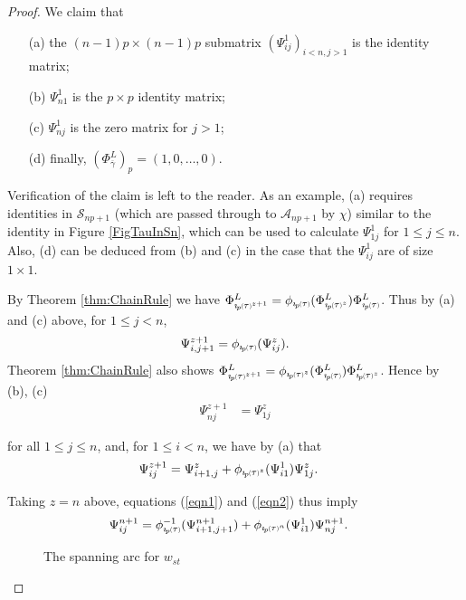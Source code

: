 \documentclass[11pt]{amsart}
\def\A{{\mathcal A}}
\newcommand*{\subsmallp}[1]{\scalebox{.5}{\ensuremath#1}}
\newcommand{\subpp}[2][p]{\imath_{\hspace*{-1pt}#1}\hspace*{-.5pt}\subsmallp(#2\subsmallp)}
\newcommand{\al}[1]{\begin{align*}#1\end{align*}}
\theoremstyle{definition}
\begin{document}
\begin{proof}
We claim that 
  \begin{enumerate}
    \item[(a)] the $(n-1)p\times(n-1)p$ submatrix $(\Psi_{ij}^1)_{i<n,j>1}$ is the identity matrix;
    \item[(b)] $\Psi_{n1}^1$ is the $p\times p$ identity matrix;
    \item[(c)] $\Psi_{nj}^1$ is the zero matrix for $j>1$;
    \item[(d)] finally, $(\Phi_{\overline\gamma}^L)_p = (1,0,\ldots,0)$.
  \end{enumerate}
Verification of the claim is left to the reader. As an example, (a) requires identities in $\mathscr S_{np+1}$ (which are passed through to $\A_{np+1}$ by $\chi$) similar to the identity in Figure \ref{FigTauInSn}, which can be used to calculate $\Psi_{1j}^1$ for $1\le j\le n$. Also, (d) can be deduced from (b) and (c) in the case that the $\Psi_{ij}^1$ are of size $1\times 1$.

By Theorem \ref{thm:ChainRule} we have $\Phi_{\subpp\tau^{z+1}}^L = \phi_{\subpp\tau}(\Phi_{\subpp\tau^{z}}^L)\Phi_{\subpp\tau}^L$. Thus by (a) and (c) above, for $1 \le j < n$,
  \begin{equation}
    \Psi_{i,j+1}^{z+1} = \phi_{\subpp\tau}(\Psi_{ij}^z).
    \label{eqn1}
  \end{equation}
Theorem \ref{thm:ChainRule} also shows $\Phi_{\subpp\tau^{z+1}}^L = \phi_{\subpp\tau^z}(\Phi_{\subpp\tau}^L)\Phi_{\subpp\tau^z}^L$. Hence by (b), (c)
  \begin{equation}
    \begin{aligned}
      \Psi_{nj}^{z+1}  &= \Psi_{1j}^z
    \end{aligned}
    \label{eqn2}
  \end{equation}
  
for all $1\le j\le n$, and, for $1\le i < n$, we have by (a) that
  \al{
    \Psi_{ij}^{z+1} &= \Psi_{i+1,j}^z + \phi_{\subpp\tau^z}(\Psi_{i1}^1)\Psi_{1j}^z.
  }

Taking $z=n$ above, equations (\ref{eqn1}) and (\ref{eqn2}) thus imply
  \al{
    \Psi_{ij}^{n+1} &= \phi_{\subpp\tau}^{-1}(\Psi_{i+1,j+1}^{n+1}) + \phi_{\subpp\tau^n}(\Psi_{i1}^1)\Psi_{nj}^{n+1}.
  }
  
  \begin{figure}[ht]
      \caption{The spanning arc for $w_{st}$}
      \label{FigSentToZero2}
    \end{figure}


\end{proof}
\end{document}
